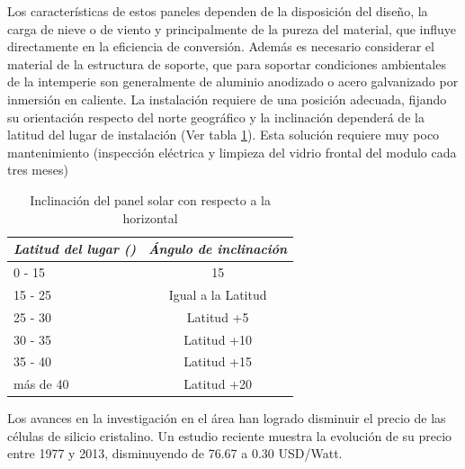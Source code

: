 Los características de estos paneles dependen de la disposición del diseño, la carga de nieve o de viento y principalmente de la pureza del material, que influye directamente en la eficiencia de conversión. Además es necesario considerar el material de la estructura de soporte, que para soportar condiciones ambientales de la intemperie son generalmente de aluminio anodizado o acero galvanizado por inmersión en caliente. La instalación requiere de una posición adecuada, fijando su orientación respecto del norte geográfico y la inclinación dependerá de la latitud del lugar de instalación (Ver tabla \ref{tab:inclina}). Esta solución requiere muy poco mantenimiento (inspección eléctrica y limpieza del vidrio frontal del modulo cada tres meses)

\begin{table}[ht]
	\centering
	\caption{Inclinación del panel solar con respecto a la horizontal}
	\begin{tabular}{@{} l *1c @{}}    \toprule
		\emph{\textbf{Latitud del lugar (\grados)}} & \emph{\textbf{Ángulo de inclinación}}\\
		\midrule
		0 - 15	& 15\grados	\\	
		15 - 25 	& Igual a la Latitud\\
		25 - 30	& Latitud +5\grados\\
		30 - 35	& Latitud +10\grados\\
		35 - 40	& Latitud +15\grados\\
		más de 40	& Latitud +20\grados\\
		\bottomrule
		\hline
	\end{tabular}
	\label{tab:inclina}
\end{table}

Los avances en la investigación en el área han logrado disminuir el precio de las células de silicio cristalino. Un estudio reciente \citep{Bloomberg} muestra la evolución de su precio entre 1977 y 2013, disminuyendo de 76.67 a 0.30 USD/Watt.



